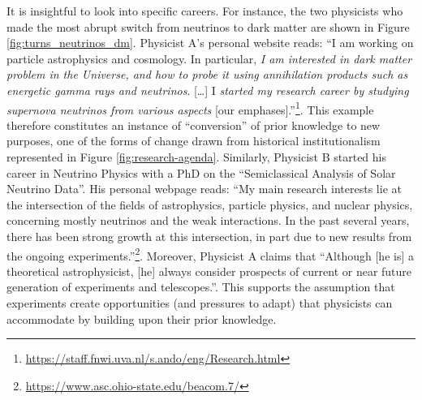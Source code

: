 \documentclass{article}
\begin{document}
It is insightful to look into specific careers. For instance, the two physicists who made the most abrupt switch from neutrinos to dark matter are shown in Figure \ref{fig:turns_neutrinos_dm}. Physicist A's personal website reads: ``I am working on particle astrophysics and cosmology. In particular, \textit{I am interested in dark matter problem in the Universe, and how to probe it using annihilation products such as energetic gamma rays and neutrinos}. [\dots]  I \textit{started my research career by studying supernova neutrinos from various aspects} [our emphases].''\footnote{\url{https://staff.fnwi.uva.nl/s.ando/eng/Research.html}}. This example therefore constitutes an instance of ``conversion'' of prior knowledge to new purposes, one of the forms of change drawn from historical institutionalism represented in Figure \ref{fig:research-agenda}. Similarly, Physicist B started his career in Neutrino Physics with a PhD on the ``Semiclassical Analysis of Solar Neutrino Data''.  His personal webpage reads: ``My main research interests lie at the intersection of the fields of astrophysics, particle physics, and nuclear physics, concerning mostly neutrinos and the weak interactions. In the past several years, there has been strong growth at this intersection, in part due to new results from the ongoing experiments.''\footnote{\url{https://www.asc.ohio-state.edu/beacom.7/}}. Moreover, Physicist A claims that ``Although [he is] a theoretical astrophysicist, [he] always consider prospects of current or near future generation of experiments and telescopes.''. This supports the assumption that experiments create opportunities (and pressures to adapt) that physicists can accommodate by building upon their prior knowledge. 
\end{document}
